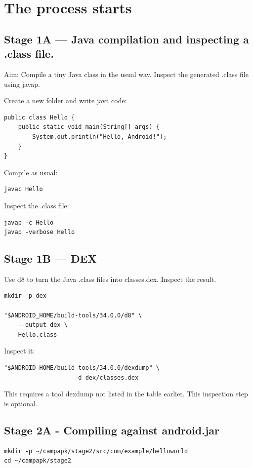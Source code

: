 \documentclass[11pt]{article}
\begin{document}
\section{The process starts}
\label{sec:org7d8a4be}

\subsection{Stage 1A — Java compilation and inspecting a .class file.}
\label{sec:org5c834dd}

Aim: Compile a tiny Java class in the usual way. Inspect the
generated .class file using javap.

Create a new folder and write java code:

\begin{verbatim}
public class Hello {
    public static void main(String[] args) {
        System.out.println("Hello, Android!");
    }
}
\end{verbatim}

Compile as usual:

\begin{verbatim}
javac Hello
\end{verbatim}

Inspect the .class file:

\begin{verbatim}
javap -c Hello
javap -verbose Hello
\end{verbatim}

\subsection{Stage 1B — DEX}
\label{sec:org60e8fbe}

Use d8 to turn the Java .class files into classes.dex. Inspect
the result. 

\begin{verbatim}
mkdir -p dex

"$ANDROID_HOME/build-tools/34.0.0/d8" \
    --output dex \
    Hello.class
\end{verbatim}

Inspect it:
\begin{verbatim}
"$ANDROID_HOME/build-tools/34.0.0/dexdump" \
                    -d dex/classes.dex
\end{verbatim}
This requires a tool dexdump not listed in the table
earlier. This inspection step is optional.

\subsection{Stage 2A - Compiling against android.jar}
\label{sec:org08178ef}
\begin{verbatim}
mkdir -p ~/campapk/stage2/src/com/example/helloworld
cd ~/campapk/stage2
\end{verbatim}
\end{document}
